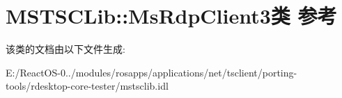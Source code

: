 \hypertarget{class_m_s_t_s_c_lib_1_1_ms_rdp_client3}{}\section{M\+S\+T\+S\+C\+Lib\+:\+:Ms\+Rdp\+Client3类 参考}
\label{class_m_s_t_s_c_lib_1_1_ms_rdp_client3}


该类的文档由以下文件生成\+:\begin{DoxyCompactItemize}
\item 
E\+:/\+React\+O\+S-\/0../modules/rosapps/applications/net/tsclient/porting-\/tools/rdesktop-\/core-\/tester/mstsclib.\+idl\end{DoxyCompactItemize}
